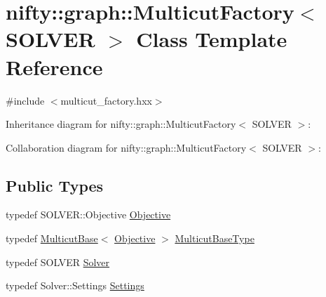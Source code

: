 \hypertarget{classnifty_1_1graph_1_1MulticutFactory}{}\section{nifty\+:\+:graph\+:\+:Multicut\+Factory$<$ S\+O\+L\+V\+E\+R $>$ Class Template Reference}
\label{classnifty_1_1graph_1_1MulticutFactory}


{\ttfamily \#include $<$multicut\+\_\+factory.\+hxx$>$}



Inheritance diagram for nifty\+:\+:graph\+:\+:Multicut\+Factory$<$ S\+O\+L\+V\+E\+R $>$\+:


Collaboration diagram for nifty\+:\+:graph\+:\+:Multicut\+Factory$<$ S\+O\+L\+V\+E\+R $>$\+:
\subsection*{Public Types}
\begin{DoxyCompactItemize}
\item 
typedef S\+O\+L\+V\+E\+R\+::\+Objective \hyperlink{classnifty_1_1graph_1_1MulticutFactory_a631a3db484b95d061faced985d6f76fc}{Objective}
\item 
typedef \hyperlink{classnifty_1_1graph_1_1MulticutBase}{Multicut\+Base}$<$ \hyperlink{classnifty_1_1graph_1_1MulticutFactory_a631a3db484b95d061faced985d6f76fc}{Objective} $>$ \hyperlink{classnifty_1_1graph_1_1MulticutFactory_abb18236a145c773fe597379289c0b659}{Multicut\+Base\+Type}
\item 
typedef S\+O\+L\+V\+E\+R \hyperlink{classnifty_1_1graph_1_1MulticutFactory_a4be2c066de2cad53c0132d80762d1a86}{Solver}
\item 
typedef Solver\+::\+Settings \hyperlink{classnifty_1_1graph_1_1MulticutFactory_a79d62ed8a9b7af1024767db79ebbdabd}{Settings}
\end{DoxyCompactItemize}
